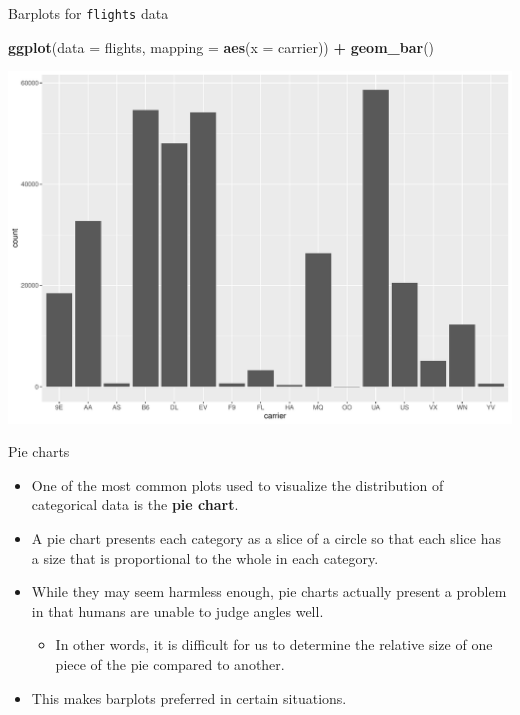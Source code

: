 \documentclass[
  ignorenonframetext,
]{beamer}
\newenvironment{Shaded}{\begin{snugshade}}{\end{snugshade}}
\newcommand{\AttributeTok}[1]{\textcolor[rgb]{0.13,0.29,0.53}{#1}}
\newcommand{\FunctionTok}[1]{\textcolor[rgb]{0.13,0.29,0.53}{\textbf{#1}}}
\newcommand{\NormalTok}[1]{#1}
\newcommand{\SpecialCharTok}[1]{\textcolor[rgb]{0.81,0.36,0.00}{\textbf{#1}}}
\providecommand{\tightlist}{%
  \setlength{\itemsep}{0pt}\setlength{\parskip}{0pt}}
\begin{document}
\begin{frame}[fragile]{Barplots for \texttt{flights} data}
\protect\hypertarget{barplots-for-flights-data-1}{}
\tiny

\begin{Shaded}
\begin{Highlighting}[]
\FunctionTok{ggplot}\NormalTok{(}\AttributeTok{data =}\NormalTok{ flights, }\AttributeTok{mapping =} \FunctionTok{aes}\NormalTok{(}\AttributeTok{x =}\NormalTok{ carrier)) }\SpecialCharTok{+}
  \FunctionTok{geom\_bar}\NormalTok{()}
\end{Highlighting}
\end{Shaded}

\begin{center}\includegraphics[width=0.9\linewidth,height=0.5\textheight]{Week2_Lect_files/figure-beamer/unnamed-chunk-40-1} \end{center}
\normalsize
\end{frame}

\begin{frame}{Pie charts}
\protect\hypertarget{pie-charts}{}
\begin{itemize}
\item
  One of the most common plots used to visualize the distribution of
  categorical data is the \textbf{pie chart}.
\item
  A pie chart presents each category as a slice of a circle so that each
  slice has a size that is proportional to the whole in each category.
\item
  While they may seem harmless enough, pie charts actually present a
  problem in that humans are unable to judge angles well.

  \begin{itemize}
  \tightlist
  \item
    In other words, it is difficult for us to determine the relative
    size of one piece of the pie compared to another.
  \end{itemize}
\item
  This makes barplots preferred in certain situations.
\end{itemize}
\end{frame}
\end{document}
